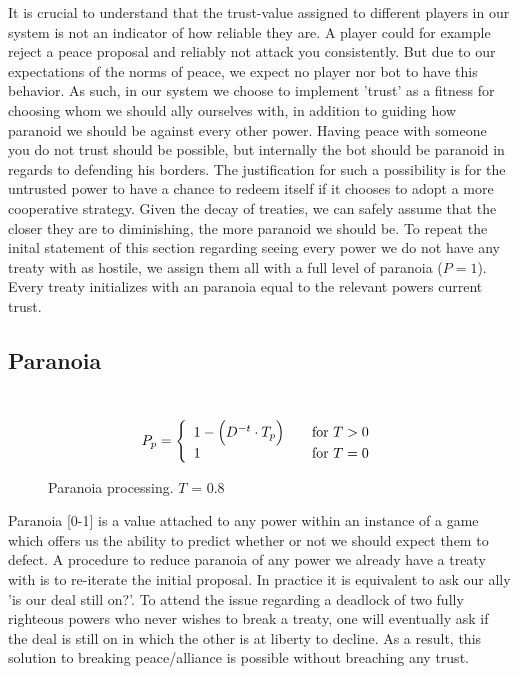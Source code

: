 \documentclass[a4paper]{article} %
\begin{document}
It is crucial to understand that the trust-value assigned to different players in our system is not an indicator of how reliable they are. A player could for example reject a peace proposal and reliably not attack you consistently. But due to our expectations of the norms of peace, we expect no player nor bot to have this behavior. As such, in our system we choose to implement 'trust' as a fitness for choosing whom we should ally ourselves with, in addition to guiding how paranoid we should be against every other power. Having peace with someone you do not trust should be possible, but internally the bot should be paranoid in regards to defending his borders. The justification for such a possibility is for the untrusted power to have a chance to redeem itself if it chooses to adopt a more cooperative strategy. Given the decay of treaties, we can safely assume that the closer they are to diminishing, the more paranoid we should be. To repeat the inital statement of this section regarding seeing every power we do not have any treaty with as hostile, we assign them all with a full level of paranoia ($P = 1$). Every treaty initializes with an paranoia equal to the relevant powers current trust. 

\subsection{Paranoia}
\
  \[ P_p = \left\{ 
  \begin{array}{l l}
    1 - \Big( D^{-t} \cdot T_p \Big) & \quad \text{for $T > 0$} \\
  1 & \quad \text{for $T = 0$}
    
  \end{array} \right.\]
\begin{figure}[H]
\centering
{}
\caption{Paranoia processing. $T$ = 0.8}
\label{fig:graph2}
\end{figure}


Paranoia [0-1]  is a value attached to any power within an instance of a game which offers us the ability to predict whether or not we should expect them to defect. A procedure to reduce paranoia of any power we already have a treaty with is to re-iterate the initial proposal. In practice it is equivalent to ask our ally 'is our deal still on?'. To attend the issue regarding a deadlock of two fully righteous powers who never wishes to break a treaty, one will eventually ask if the deal is still on in which the other is at liberty to decline. As a result, this solution to breaking peace/alliance is possible without breaching any trust.
\end{document}
